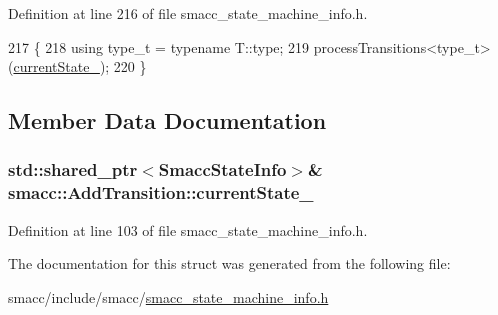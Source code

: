 Definition at line 216 of file smacc\+\_\+state\+\_\+machine\+\_\+info.\+h.


\begin{DoxyCode}
217 \{
218     \textcolor{keyword}{using} type\_t = \textcolor{keyword}{typename} T::type;
219     processTransitions<type\_t>(\hyperlink{structsmacc_1_1AddTransition_a0fd1d2d424ac74b700a46f8409fc8353}{currentState\_});
220 \}
\end{DoxyCode}


\subsection{Member Data Documentation}
\subsubsection[{\texorpdfstring{current\+State\+\_\+}{currentState_}}]{\setlength{\rightskip}{0pt plus 5cm}std\+::shared\+\_\+ptr$<${\bf Smacc\+State\+Info}$>$\& smacc\+::\+Add\+Transition\+::current\+State\+\_\+}\hypertarget{structsmacc_1_1AddTransition_a0fd1d2d424ac74b700a46f8409fc8353}{}\label{structsmacc_1_1AddTransition_a0fd1d2d424ac74b700a46f8409fc8353}


Definition at line 103 of file smacc\+\_\+state\+\_\+machine\+\_\+info.\+h.



The documentation for this struct was generated from the following file\+:\begin{DoxyCompactItemize}
\item 
smacc/include/smacc/\hyperlink{smacc__state__machine__info_8h}{smacc\+\_\+state\+\_\+machine\+\_\+info.\+h}\end{DoxyCompactItemize}
